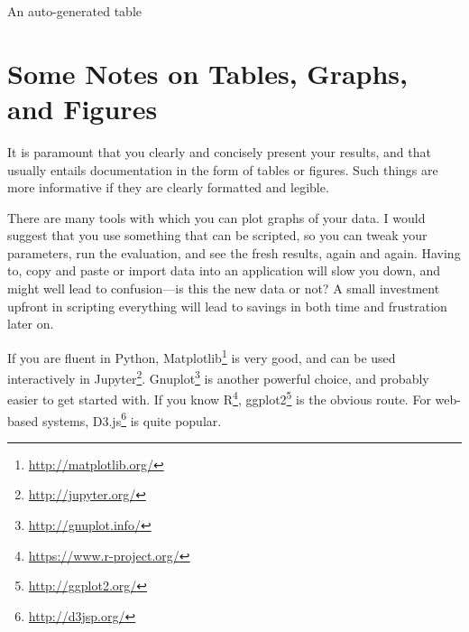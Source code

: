 \begin{table}
  \myfloatalign
  \caption{An auto-generated table} \label{tab:pretty-table}
\end{table}



\section{Some Notes on Tables, Graphs, and Figures}
\label{sec:some-notes-tables}

It is paramount that you clearly and concisely present your results, and
that usually entails documentation in the form of tables or figures.  Such
things are more informative if they are clearly formatted and legible.

There are many tools with which you can plot graphs of your data. I would
suggest that you use something that can be scripted, so you can tweak your
parameters, run the evaluation, and see the fresh results, again and
again. Having to, \eg copy and paste or import data into an application will
slow you down, and might well lead to confusion---is this the new data or
not? A small investment upfront in scripting everything will lead to
savings in both time and frustration later on.

If you are fluent in Python,
Matplotlib\footnote{\url{http://matplotlib.org/}} is very good, and can be
used interactively in
Jupyter\footnote{\url{http://jupyter.org/}}. Gnuplot\footnote{\url{http://gnuplot.info/}}
is another powerful choice, and probably easier to get started with. If you
know R\footnote{\url{https://www.r-project.org/}},
ggplot2\footnote{\url{http://ggplot2.org/}} is the obvious route.  For
web-based systems, D3.js\footnote{\url{http://d3jsp.org/}} is quite popular.

